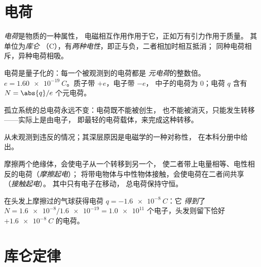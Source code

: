 \section{电荷}

\begin{definition}[电荷]\label{def:g11:fundamental-interactions:charge}
\emph{电荷}是物质的一种属性，
电磁相互作用作用于它，正如万有引力作用于质量。
其单位为\emph{库仑}
（\unit{C}），有\emph{两种电性}，即正与负，二者相加时相互抵消；
同种电荷相斥，异种电荷相吸。
\end{definition}

\begin{definition}[元电荷]\label{def:g11:fundamental-interactions:elementary}
电荷是量子化的：每一个被观测到的电荷都是
\emph{元电荷}的整数倍。
$e = \qty{1.60e-19}{C}$。质子带 $+e$，电子带 $-e$，
中子的电荷为 $0$；电荷 $q$ 含有 $N = \abs{q}/e$ 个元电荷。
\end{definition}

\begin{proposition}[电荷守恒]\label{prop:g11:fundamental-interactions:conservation}
孤立系统的总电荷永远不变：电荷既不能被创生，
也不能被消灭，只能发生转移——实际上是由电子，
即最轻的电荷载体，来完成这种转移。
\end{proposition}
\admitted

\begin{remark}\label{rem:g11:fundamental-interactions:conservation}
从未观测到违反的情况；其深层原因是电磁学的一种对称性，
在本科分册中给出。
\end{remark}

\begin{definition}[摩擦起电与接触起电]\label{def:g11:fundamental-interactions:charging}
摩擦两个绝缘体，会使电子从一个转移到另一个，
使二者带上电量相等、电性相反的电荷（\emph{摩擦起电}）；
将带电物体与中性物体接触，会使电荷在二者间共享
（\emph{接触起电}）。
其中只有电子在移动，
总电荷保持守恒。
\end{definition}

\begin{example}[计算电子个数]\label{ex:g11:fundamental-interactions:balloon}
在头发上摩擦过的气球获得电荷 $q = \qty{-1.6e-8}{C}$：它
\emph{得到}了 $N = \num{1.6e-8} / \num{1.6e-19} = \num{1.0e11}$
个电子，头发则留下恰好 $+\qty{1.6e-8}{C}$ 的电荷。
\end{example}

\section{库仑定律}


